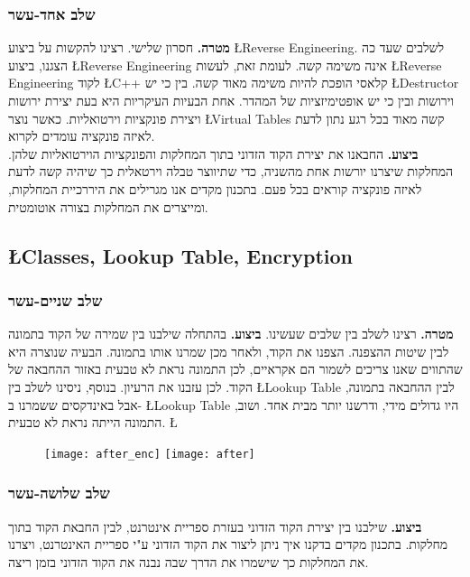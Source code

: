 \documentclass{article}
\newcommand{\goal}{\textbf{מטרה. }}
\newcommand{\action}{\textbf{ביצוע. }}
\begin{document}
			\subsubsection{שלב אחד-עשר}
			\goal 
			חסרון שלישי. רצינו להקשות על ביצוע 
			\L{Reverse Engineering}. 
			לשלבים שעד כה הצגנו, ביצוע 
			\L{Reverse Engineering} 
			אינה משימה קשה. לעומת זאת, לעשות 
			\L{Reverse Engineering} 
			לקוד 
			\L{C++} 
			קלאסי הופכת להיות משימה מאוד קשה. 
			בין כי יש 
			\L{Destructor} 
			וירושות ובין כי יש אופטימיזציות של המהדר. 
			אחת הבעיות העיקריות היא בעת יצירת ירושות ויצירת פונקציות וירטואליות. כאשר נוצר 
			\L{Virtual Tables} 
			קשה מאוד בכל רגע נתון לדעת לאיזה פונקציה עומדים לקרוא. \\
			\action 
			החבאנו את יצירת הקוד הזדוני בתוך המחלקות והפונקציות 
			הוירטואליות שלהן. המחלקות שיצרנו יורשות אחת מהשניה, 
			כדי שתיווצר טבלה וירטאלית כך שיהיה קשה לדעת לאיזה פונקציה 
			קוראים בכל פעם. 
			בתכנון מקדים אנו מגרילים את היררכיית המחלקות, ומייצרים את המחלקות בצורה אוטומטית. 
			\subsection*{\L{Classes, Lookup Table, Encryption}}
			\subsubsection{שלב שניים-עשר} 
			\goal 
			רצינו לשלב בין שלבים שעשינו. 
			\action 
			בהתחלה שילבנו בין שמירה של הקוד בתמונה לבין שיטות ההצפנה. 
			הצפנו את הקוד, ולאחר מכן שמרנו אותו בתמונה. 
			הבעיה שנוצרה היא שהתווים שאנו צריכים לשמור הם אקראיים, 
			לכן התמונה נראת לא טבעית באזור ההחבאה של הקוד. לכן עזבנו את הרעיון.  
			בנוסף, ניסינו לשלב בין 
			\L{Lookup Table} 
			לבין ההחבאה בתמונה, אבל באינדקסים ששמרנו ב- 
			\L{Lookup Table} 
			היו גדולים מידי, ודרשנו יותר מבית אחד. 
			ושוב, התמונה הייתה נראת לא טבעית. 
			\L{\begin{figure}[h]
					\centering
					\texttt{[image: after\_enc]}
					\texttt{[image: after]}
			\end{figure}} 
			\subsubsection{שלב שלושה-עשר} 
			\action  
			שילבנו בין יצירת הקוד הזדוני בעזרת ספריית אינטרנט, לבין 
			החבאת הקוד בתוך מחלקות. 
			בתכנון מקדים בדקנו איך ניתן ליצור את הקוד הזדוני ע"י ספריית האינטרנט, ויצרנו את המחלקות כך שישמרו את הדרך שבה נבנה את הקוד הזדוני בזמן ריצה. 
\end{document}
